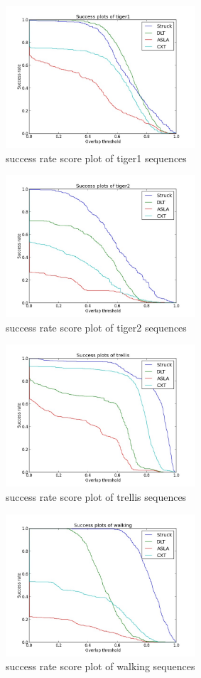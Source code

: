 \documentclass{acm_proc_article-sp}
\begin{document}
\begin{figure}[hbt]
    \includegraphics[width=200pt]{tiger1.jpg}
    \caption{success rate score plot of tiger1 sequences}
    \label{fig:tiger1}
\end{figure}

\begin{figure}[hbt]
    \includegraphics[width=200pt]{tiger2.jpg}
    \caption{success rate score plot of tiger2 sequences}
    \label{fig:tiger2}
\end{figure}

\begin{figure}[hbt]
    \includegraphics[width=200pt]{trellis.jpg}
    \caption{success rate score plot of trellis sequences}
    \label{fig:trellis}
\end{figure}

\begin{figure}[hbt]
    \includegraphics[width=200pt]{walking.jpg}
    \caption{success rate score plot of walking sequences}
    \label{fig:walking}
\end{figure}
\end{document}
